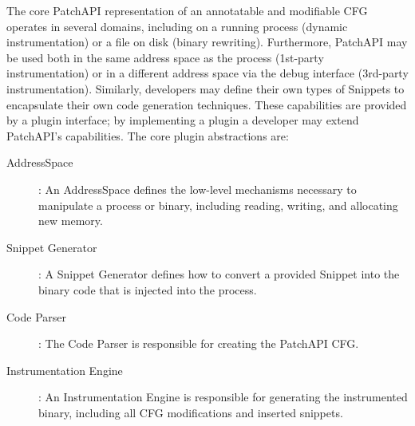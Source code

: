 The core PatchAPI representation of an annotatable and modifiable CFG
operates in several domains, including on a running process (dynamic
instrumentation) or a file on disk (binary rewriting). Furthermore,
PatchAPI may be used both in the same address space as the process
(1st-party instrumentation) or in a different address space via the
debug interface (3rd-party instrumentation). Similarly, developers may
define their own types of Snippets to encapsulate their own code
generation techniques. These capabilities are provided by a plugin
interface; by implementing a plugin a developer may extend PatchAPI's
capabilities. The core plugin abstractions are:

\begin{description}
\item[AddressSpace]: An AddressSpace defines the low-level mechanisms
  necessary to manipulate a process or binary, including reading,
  writing, and allocating new memory.
\item[Snippet Generator]: A Snippet Generator defines how to convert a
  provided Snippet into the binary code that is injected into the
  process.
\item[Code Parser]: The Code Parser is responsible for creating the
  PatchAPI CFG. 
\item[Instrumentation Engine]: An Instrumentation Engine is
  responsible for generating the instrumented binary, including all
  CFG modifications and inserted snippets.
\end{description}

